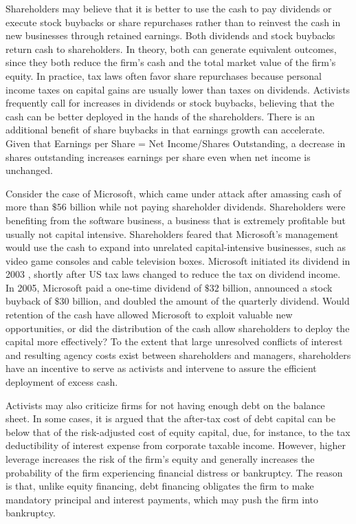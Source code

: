 \documentclass[11pt]{article}
\begin{document}
Shareholders may believe that it is better to use the cash to pay dividends or execute stock buybacks or share repurchases rather than to reinvest the cash in new businesses through retained earnings. Both dividends and stock buybacks return cash to shareholders. In theory, both can generate equivalent outcomes, since they both reduce the firm's cash and the total market value of the firm's equity. In practice, tax laws often favor share repurchases because personal income taxes on capital gains are usually lower than taxes on dividends. Activists frequently call for increases in dividends or stock buybacks, believing that the cash can be better deployed in the hands of the shareholders. There is an additional benefit of share buybacks in that earnings growth can accelerate. Given that Earnings per Share = Net Income/Shares Outstanding, a decrease in shares outstanding increases earnings per share even when net income is unchanged.

Consider the case of Microsoft, which came under attack after amassing cash of more than $\$ 56$ billion while not paying shareholder dividends. Shareholders were benefiting from the software business, a business that is extremely profitable but usually not capital intensive. Shareholders feared that Microsoft's management would use the cash to expand into unrelated capital-intensive businesses, such as video game consoles and cable television boxes. Microsoft initiated its dividend in 2003 , shortly after US tax laws changed to reduce the tax on dividend income. In 2005, Microsoft paid a one-time dividend of $\$ 32$ billion, announced a stock buyback of $\$ 30$ billion, and doubled the amount of the quarterly dividend. Would retention of the cash have allowed Microsoft to exploit valuable new opportunities, or did the distribution of the cash allow shareholders to deploy the capital more effectively? To the extent that large unresolved conflicts of interest and resulting agency costs exist between shareholders and managers, shareholders have an incentive to serve as activists and intervene to assure the efficient deployment of excess cash.

Activists may also criticize firms for not having enough debt on the balance sheet. In some cases, it is argued that the after-tax cost of debt capital can be below that of the risk-adjusted cost of equity capital, due, for instance, to the tax deductibility of interest expense from corporate taxable income. However, higher leverage increases the risk of the firm's equity and generally increases the probability of the firm experiencing financial distress or bankruptcy. The reason is that, unlike equity financing, debt financing obligates the firm to make mandatory principal and interest payments, which may push the firm into bankruptcy.
\end{document}
